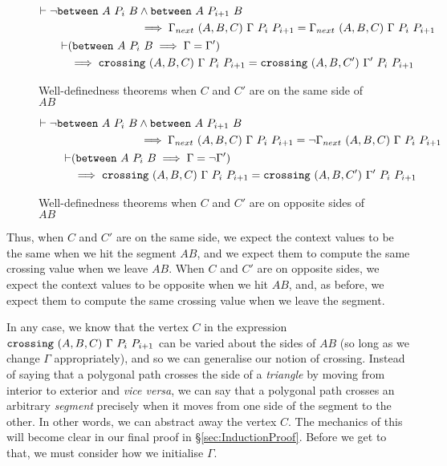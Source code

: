 \begin{figure}
  \begin{gather*}
    \begin{split}
      \vdash\neg\texttt{between}\ A\ P_i\ B&\wedge\texttt{between}\ A\ P_{i+1}\ B\\
      &\implies \Gamma_{next}\ (A,B,C)\ \Gamma\ P_i\ P_{i+1} = \Gamma_{next}\ (A,B,C)\ \Gamma\ P_i\ P_{i+1}
    \end{split}\\
    \begin{split}
      \vdash&(\texttt{between}\ A\ P_i\ B\implies \Gamma = \Gamma')\\
      &\implies\texttt{crossing}\ (A,B,C)\ \Gamma\ P_i\ P_{i+1} = \texttt{crossing}\ (A,B,C')\ \Gamma'\ P_i\ P_{i+1}
    \end{split}
  \end{gather*}
  \caption{Well-definedness theorems when $C$ and $C'$ are on the same side of $AB$}
  \label{fig:CrossChange1}
\end{figure}

\begin{figure}
  \begin{gather*}
    \begin{split}
      \vdash\neg\texttt{between}\ A\ P_i\ B&\wedge\texttt{between}\ A\ P_{i+1}\ B\\
      &\implies \Gamma_{next}\ (A,B,C)\ \Gamma\ P_i\ P_{i+1} = \neg\Gamma_{next}\ (A,B,C)\ \Gamma\ P_i\ P_{i+1}
    \end{split}\\
    \begin{split}
      \vdash&(\texttt{between}\ A\ P_i\ B\implies \Gamma = \neg\Gamma')\\
      &\implies\texttt{crossing}\ (A,B,C)\ \Gamma\ P_i\ P_{i+1} = \texttt{crossing}\ (A,B,C')\ \Gamma'\ P_i\ P_{i+1}
    \end{split}
  \end{gather*}
  \caption{Well-definedness theorems when $C$ and $C'$ are on opposite sides of $AB$}
  \label{fig:CrossChange2}
\end{figure}

Thus, when $C$ and $C'$ are on the same side, we expect the context values to be the same when we hit the segment $AB$, and we expect them to compute the same crossing value when we leave $AB$. When $C$ and $C'$ are on opposite sides, we expect the context values to be opposite when we hit $AB$, and, as before, we expect them to compute the same crossing value when we leave the segment.

In any case, we know that the vertex $C$ in the expression $\code{crossing}\ (A,B,C)\ \Gamma\ P_i\ P_{i+1}$ can be varied about the sides of $AB$ (so long as we change $\Gamma$ appropriately), and so we can generalise our notion of crossing. Instead of saying that a polygonal path crosses the side of a  \emph{triangle} by moving from interior to exterior and \emph{vice versa}, we can say that a polygonal path crosses an arbitrary \emph{segment} precisely when it moves from one side of the segment to the other. In other words, we can abstract away the vertex $C$. The mechanics of this will become clear in our final proof in \S\ref{sec:InductionProof}. Before we get to that, we must consider how we initialise $\Gamma$.


